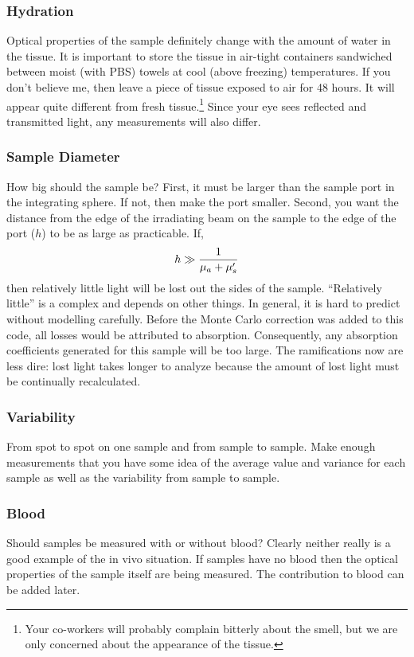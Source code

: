 \documentclass{article}
\begin{document}
\subsubsection{Hydration} 
Optical properties of the sample definitely change with the amount of water in the
tissue.  It is important to store the tissue in air-tight containers
sandwiched between moist (with PBS) towels at cool (above
freezing) temperatures.  If you don't believe me, then leave a piece of
tissue exposed to air for 48 hours.  It will appear quite different from
fresh tissue.\footnote{Your co-workers will probably complain
bitterly about the smell, but we are only concerned about the appearance of
the tissue.}  Since your eye sees reflected and transmitted light, any
measurements will also differ.

\subsubsection{Sample Diameter}
How big should the sample be?  First, it must be larger than the sample port
in the integrating sphere.  If not, then make the port smaller.  Second,
you want the distance from the edge of the irradiating beam on the sample
to the edge of the port ($h$) to be as large as practicable. If,
\begin{eqnarray*}
h \gg {1\over \mu_a+\mu_s'}
\end{eqnarray*}
then relatively little light will be lost out the sides of the sample.  
``Relatively little'' is a complex and depends on other things.  In general,
it is hard to predict without modelling carefully.  Before the Monte Carlo
correction was added to this code, all losses would be attributed to absorption.  Consequently, any absorption coefficients generated for this sample will be too large.  The ramifications now are less dire: lost light takes longer to analyze because
the amount of lost light must be continually recalculated.  

\subsubsection{Variability}
 From spot to spot on one sample and from sample to sample.  Make enough
measurements that you have some idea of the average value and variance for
each sample as well as the variability from sample to sample.

\subsubsection{Blood} 
Should samples be measured with or without blood?
Clearly neither really is a good example of the in vivo situation.  If
samples have no blood then the optical properties of the sample itself are
being measured.  The contribution to blood can be added later.
\end{document}
